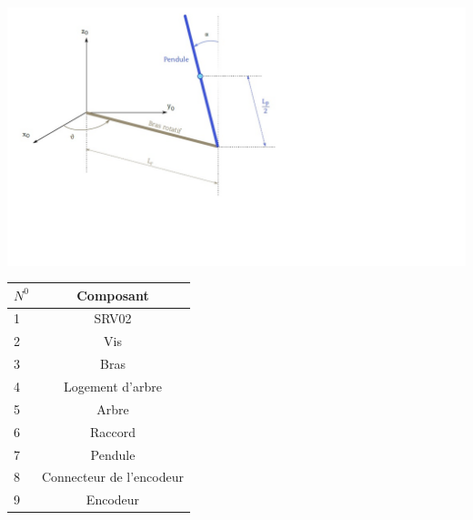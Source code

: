 \documentclass[12pt, a4paper, openany]{report}
\begin{document}
\begin{center}
\includegraphics[scale=0.8]{SchemaPendule.png}
\label{fig2} 
\end{center}


\begin{center}
\begin{tabular}{|l|c|}
\hline \rowcolor{mauve} $N^{0}$ & Composant\\
\hline 1 & SRV02\\
\hline 2 & Vis\\
\hline 3 & Bras\\
\hline 4 & Logement d’arbre\\
\hline 5 & Arbre\\
\hline 6 & Raccord\\
\hline 7 & Pendule\\
\hline 8 & Connecteur de l'encodeur\\
\hline 9 & Encodeur\\
\hline
\end{tabular}

\end{center}

     
\end{document}

